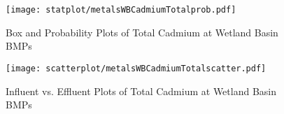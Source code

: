         \begin{figure}[hb]   %
            \centering
            \texttt{[image: statplot/metalsWBCadmiumTotalprob.pdf]}
            \caption{Box and Probability Plots of Total Cadmium at Wetland Basin BMPs}
        \end{figure}         %
        
        
        \begin{figure}[hb]   %
            \centering
            \texttt{[image: scatterplot/metalsWBCadmiumTotalscatter.pdf]}
            \caption{Influent vs. Effluent Plots of Total Cadmium at Wetland Basin BMPs}
        \end{figure}         %
        \clearpage
        